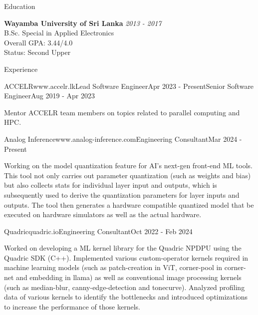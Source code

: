 \documentclass[
	11pt, %
]{./assets/resume} %
\begin{document}
\begin{rSection}{Education}

	\textbf{Wayamba University of Sri Lanka} \hfill \textit{2013 - 2017} \\ 
	B.Sc. Special in Applied Electronics \\
	Overall GPA: 3.44/4.0 \\
	Status: Second Upper
	
\end{rSection}


\begin{rSection}{Experience}

	\begin{rSubsectionM}{ACCELR}{www.accelr.lk}{Lead Software Engineer}{Apr 2023 - Present}{Senior Software Engineer}{Aug 2019 - Apr 2023}{}{}
        \item Mentor ACCELR team members on topics related to parallel computing and HPC.
	\end{rSubsectionM}

	\begin{rSubsectionX}{Analog Inference}{www.analog-inference.com}{Engineering Consultant}{Mar 2024 - Present}
		\item Working on the model quantization feature for AI's next-gen front-end ML tools. This tool not only carries out parameter quantization (such as weights and bias) but also collects stats for individual layer input and outputs, which is subsequently used to derive the quantization parameters for layer inputs and outputs. The tool then generates a hardware compatible quantized model that be executed on hardware simulators as well as the actual hardware.
	\end{rSubsectionX}

	\begin{rSubsectionX}{Quadric}{quadric.io}{Engineering Consultant}{Oct 2022 - Feb 2024}
		\item Worked on developing a ML kernel library for the Quadric NPDPU using the Quadric SDK (C++). Implemented various custom-operator kernels required in machine learning models (such as patch-creation in ViT, corner-pool in corner-net and embedding in llama) as well as conventional image processing kernels (such as median-blur, canny-edge-detection and tonecurve). Analyzed profiling data of various kernels to identify the bottlenecks and introduced optimizations to increase the performance of those kernels.
	\end{rSubsectionX}


\end{rSection}
\end{document}
